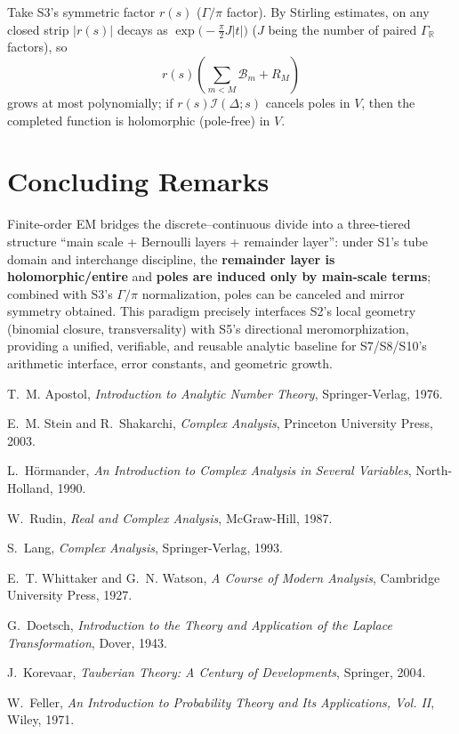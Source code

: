 \documentclass[11pt,a4paper]{article}
\theoremstyle{remark}
\begin{document}
Take S3's symmetric factor $r(s)$ ($\Gamma/\pi$ factor). By Stirling estimates, on any closed strip $|r(s)|$ decays as $\exp\bigl(-\frac{\pi}{2}J|t|\bigr)$ ($J$ being the number of paired $\Gamma_{\mathbb{R}}$ factors), so
\begin{equation}
r(s)\left(\sum_{m<M}\mathcal{B}_m+R_M\right)
\end{equation}
grows at most polynomially; if $r(s)\mathcal{I}(\Delta;s)$ cancels poles in $V$, then the completed function is holomorphic (pole-free) in $V$.

\section*{Concluding Remarks}

Finite-order EM bridges the discrete--continuous divide into a three-tiered structure ``main scale + Bernoulli layers + remainder layer'': under S1's tube domain and interchange discipline, the \textbf{remainder layer is holomorphic/entire} and \textbf{poles are induced only by main-scale terms}; combined with S3's $\Gamma/\pi$ normalization, poles can be canceled and mirror symmetry obtained. This paradigm precisely interfaces S2's local geometry (binomial closure, transversality) with S5's directional meromorphization, providing a unified, verifiable, and reusable analytic baseline for S7/S8/S10's arithmetic interface, error constants, and geometric growth.

\begin{thebibliography}{9}

T.~M. Apostol, \emph{Introduction to Analytic Number Theory}, Springer-Verlag, 1976.

E.~M. Stein and R.~Shakarchi, \emph{Complex Analysis}, Princeton University Press, 2003.

L.~H\"ormander, \emph{An Introduction to Complex Analysis in Several Variables}, North-Holland, 1990.

W.~Rudin, \emph{Real and Complex Analysis}, McGraw-Hill, 1987.

S.~Lang, \emph{Complex Analysis}, Springer-Verlag, 1993.

E.~T. Whittaker and G.~N. Watson, \emph{A Course of Modern Analysis}, Cambridge University Press, 1927.

G.~Doetsch, \emph{Introduction to the Theory and Application of the Laplace Transformation}, Dover, 1943.

J.~Korevaar, \emph{Tauberian Theory: A Century of Developments}, Springer, 2004.

W.~Feller, \emph{An Introduction to Probability Theory and Its Applications, Vol. II}, Wiley, 1971.

\end{thebibliography}
\end{document}
